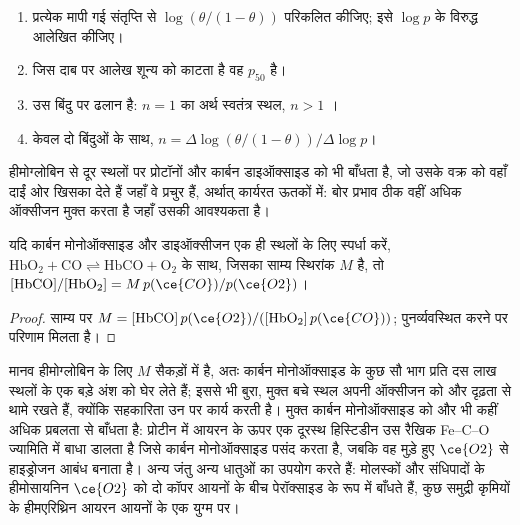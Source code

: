 \begin{method}[हिल आलेख पढ़ना]\label{met:b3:bioinorganic:hill-plot}
\begin{enumerate}
  \item प्रत्येक मापी गई संतृप्ति से $\log(\theta/(1 - \theta))$ परिकलित कीजिए; इसे $\log p$ के विरुद्ध आलेखित कीजिए।
  \item जिस दाब पर आलेख शून्य को काटता है वह $p_{50}$ है।
  \item उस बिंदु पर ढलान  है: $n = 1$ का अर्थ स्वतंत्र
        स्थल, $n > 1$ ।
  \item केवल दो बिंदुओं के साथ, $n = \Delta\log(\theta/(1 - \theta))/\Delta\log p$।
\end{enumerate}
\end{method}

हीमोग्लोबिन  से दूर स्थलों पर प्रोटॉनों और कार्बन डाइऑक्साइड को भी बाँधता है,
जो उसके वक्र को वहाँ दाईं ओर खिसका देते हैं जहाँ वे प्रचुर हैं, अर्थात् कार्यरत ऊतकों में:
बोर प्रभाव ठीक वहीं अधिक ऑक्सीजन मुक्त करता है जहाँ उसकी आवश्यकता है।

\begin{proposition}[कार्बन मोनोऑक्साइड स्पर्धा]\label{prop:b3:bioinorganic:haldane}
यदि कार्बन मोनोऑक्साइड और डाइऑक्सीजन एक ही स्थलों के लिए स्पर्धा करें,
$\mathrm{HbO_2 + CO \rightleftharpoons HbCO + O_2}$ के साथ, जिसका साम्य स्थिरांक $M$ है, तो
$[\mathrm{HbCO}]/[\mathrm{HbO_2}] = M\,p(\ce{CO})/p(\ce{O2})$।
\end{proposition}

\begin{proof}
साम्य पर $M = [\mathrm{HbCO}]\,p(\ce{O2})/([\mathrm{HbO_2}]\,p(\ce{CO}))$; पुनर्व्यवस्थित करने पर परिणाम मिलता है।
\end{proof}

मानव हीमोग्लोबिन के लिए $M$ सैकड़ों में है, अतः कार्बन मोनोऑक्साइड के कुछ सौ भाग प्रति
दस लाख स्थलों के एक बड़े अंश को घेर लेते हैं; इससे भी बुरा, मुक्त बचे
स्थल अपनी ऑक्सीजन को और दृढ़ता से थामे रखते हैं, क्योंकि सहकारिता
उन पर कार्य करती है। मुक्त  कार्बन मोनोऑक्साइड को और भी कहीं अधिक प्रबलता से बाँधता है:
प्रोटीन में आयरन के ऊपर एक दूरस्थ हिस्टिडीन उस रैखिक Fe--C--O
ज्यामिति में बाधा डालता है जिसे कार्बन मोनोऑक्साइड पसंद करता है, जबकि वह मुड़े हुए $\ce{O2}$ से हाइड्रोजन आबंध बनाता है।
अन्य जंतु अन्य धातुओं का उपयोग करते हैं: मोलस्कों और संधिपादों के हीमोसायनिन
$\ce{O2}$ को दो कॉपर आयनों के बीच पेरॉक्साइड के रूप में बाँधते हैं, कुछ समुद्री
कृमियों के हीमएरिथ्रिन आयरन आयनों के एक युग्म पर।

